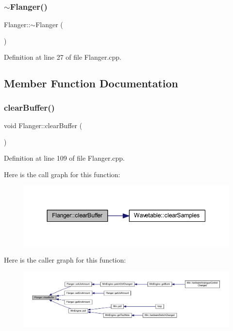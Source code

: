 \subsubsection{\texorpdfstring{$\sim$\+Flanger()}{~Flanger()}}
{\footnotesize\ttfamily Flanger\+::$\sim$\+Flanger (\begin{DoxyParamCaption}{ }\end{DoxyParamCaption})}



Definition at line 27 of file Flanger.\+cpp.



\subsection{Member Function Documentation}
\mbox{\label{class_flanger_ae94929f1469d1924d24537e2b265796d}} 
\subsubsection{\texorpdfstring{clear\+Buffer()}{clearBuffer()}}
{\footnotesize\ttfamily void Flanger\+::clear\+Buffer (\begin{DoxyParamCaption}{ }\end{DoxyParamCaption})}



Definition at line 109 of file Flanger.\+cpp.

Here is the call graph for this function\+:
\nopagebreak
\begin{figure}[H]
\begin{center}
\leavevmode
\includegraphics[width=344pt]{d5/d64/class_flanger_ae94929f1469d1924d24537e2b265796d_cgraph}
\end{center}
\end{figure}
Here is the caller graph for this function\+:
\nopagebreak
\begin{figure}[H]
\begin{center}
\leavevmode
\includegraphics[width=350pt]{d5/d64/class_flanger_ae94929f1469d1924d24537e2b265796d_icgraph}
\end{center}
\end{figure}
\mbox{\label{class_flanger_ae86b7a0721c3a9893f3b9ec5f4b6c0fb}} 
